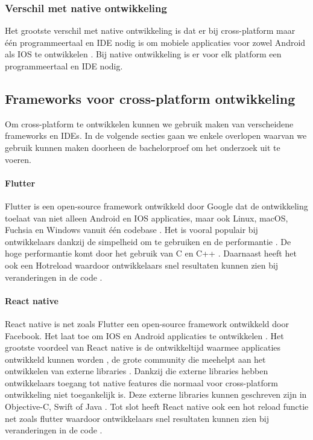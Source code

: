 \subsubsection{Verschil met native ontwikkeling}
Het grootste verschil met native ontwikkeling is dat er bij cross-platform maar één 
programmeertaal en IDE nodig is om mobiele applicaties voor zowel Android als IOS te 
ontwikkelen \autocite{Hu2021}. Bij native ontwikkeling is er voor elk platform een 
programmeertaal en IDE nodig. 

\subsection{Frameworks voor cross-platform ontwikkeling}
Om cross-platform te ontwikkelen kunnen we gebruik maken van verscheidene frameworks en 
IDEs. In de volgende secties gaan we enkele overlopen waarvan we gebruik kunnen maken 
doorheen de bachelorproef om het onderzoek uit te voeren.

\paragraph{Flutter}
Flutter is een open-source framework ontwikkeld door Google dat de ontwikkeling toelaat 
van niet alleen Android en IOS applicaties, maar ook Linux, macOS, Fuchsia en Windows 
vanuit één codebase \autocite{Okeke2022a}. Het is vooral populair bij ontwikkelaars 
dankzij de simpelheid om te gebruiken en de performantie \autocite{Sakovich22023}. De 
hoge performantie komt door het gebruik van C en C++ \autocite{Terekhov2022}. Daarnaast 
heeft het ook een \gls{Hotreload} waardoor ontwikkelaars snel resultaten kunnen zien bij 
veranderingen in de code \autocite{Sakovich22023}.

\paragraph{React native}
React native is net zoals Flutter een open-source framework ontwikkeld door Facebook. 
Het laat toe om IOS en Android applicaties te ontwikkelen \autocite{Terekhov2022}. 
Het grootste voordeel van React native is de ontwikkeltijd waarmee applicaties ontwikkeld 
kunnen worden \autocite{Terekhov2022}, de grote community die meehelpt aan het ontwikkelen 
van externe libraries \autocite{Okeke2022a}. Dankzij die externe libraries hebben ontwikkelaars 
toegang tot native features die normaal voor cross-platform ontwikkeling niet toegankelijk is. 
Deze externe libraries kunnen geschreven zijn in Objective-C, Swift of Java \autocite{Okeke2022a}. 
Tot slot heeft React native ook een hot reload functie net zoals flutter waardoor ontwikkelaars 
snel resultaten kunnen zien bij veranderingen in de code \autocite{Terekhov2022}.

